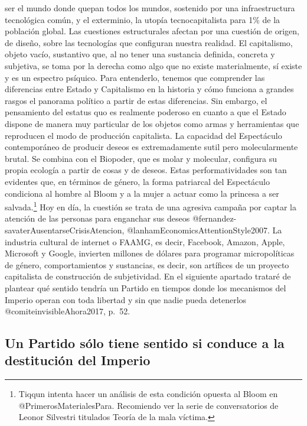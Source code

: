 \documentclass[
]{article}
\begin{document}
ser el mundo donde quepan todos los mundos, sostenido por una
infraestructura tecnológica común, y el exterminio, la utopía
tecnocapitalista para 1\% de la población global. Las cuestiones
estructurales afectan por una cuestión de origen, de diseño, sobre las
tecnologías que configuran nuestra realidad. El capitalismo, objeto
vacío, sustantivo que, al no tener una sustancia definida, concreta y
subjetiva, se toma por la derecha como algo que no existe materialmente,
sí existe y es un espectro psíquico. Para entenderlo, tenemos que
comprender las diferencias entre Estado y Capitalismo en la historia y
cómo funciona a grandes rasgos el panorama político a partir de estas
diferencias. Sin embargo, el pensamiento del estatus quo es realmente
poderoso en cuanto a que el Estado dispone de manera muy particular de
los objetos como armas y herramientas que reproducen el modo de
producción capitalista. La capacidad del Espectáculo contemporáneo de
producir deseos es extremadamente sutil pero molecularmente brutal. Se
combina con el Biopoder, que es molar y molecular, configura su propia
ecología a partir de cosas y de deseos. Estas performatividades son tan
evidentes que, en términos de género, la forma patriarcal del
Espectáculo condiciona al hombre al Bloom y a la mujer a actuar como la
princesa a ser salvada.\footnote{Tiqqun intenta hacer un análisis de
  esta condición opuesta al Bloom en @PrimerosMaterialesPara. Recomiendo
  ver la serie de conversatorios de Leonor Silvestri titulados Teoría de
  la mala víctima.} Hoy en día, la cuestión se trata de una agresiva
campaña por captar la atención de las personas para enganchar sus deseos
@fernandez-savaterAusentarseCrisisAtencion,
@lanhamEconomicsAttentionStyle2007. La industria cultural de internet o
FAAMG, es decir, Facebook, Amazon, Apple, Microsoft y Google, invierten
millones de dólares para programar micropolíticas de género,
comportamientos y sustancias, es decir, son artífices de un proyecto
capitalista de construcción de subjetividad. En el siguiente apartado
trataré de plantear qué sentido tendría un Partido en tiempos donde los
mecanismos del Imperio operan con toda libertad y sin que nadie pueda
detenerlos @comiteinvisibleAhora2017, p.~52.

\hypertarget{un-partido-suxf3lo-tiene-sentido-si-conduce-a-la-destituciuxf3n-del-imperio}{%
\subsection{Un Partido sólo tiene sentido si conduce a la destitución
del
Imperio}\label{un-partido-suxf3lo-tiene-sentido-si-conduce-a-la-destituciuxf3n-del-imperio}}
\end{document}
